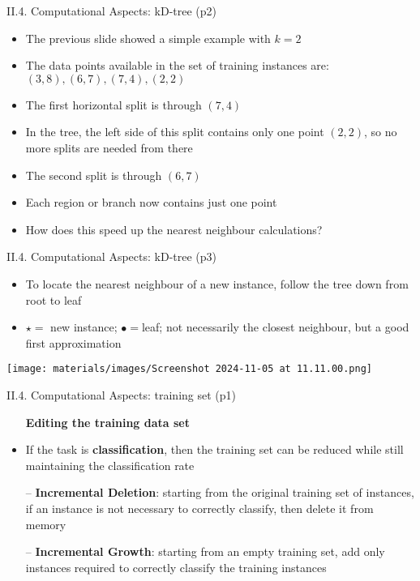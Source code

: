 \documentclass[handout]{beamer}
\newcommand{\strong}[1]{\textbf{\color{teal} #1}}
\begin{document}
\begin{frame}{II.4. Computational Aspects: kD-tree (p2)}
\begin{itemize}
\item The previous slide showed a simple example with $k=2$
\item The data points available in the set of training instances are: $(3,8), (6,7), (7,4), (2,2)$
\item The first horizontal split is through $(7,4)$
\item In the tree, the left side of this split contains only one point $(2,2)$, so no more splits are needed from there
\item The second split is through $(6,7)$
\item Each region or branch now contains just one point
\item[]
\item How does this speed up the nearest neighbour calculations?
\end{itemize}
\end{frame}
\begin{frame}{II.4. Computational Aspects: kD-tree (p3)}
\begin{itemize}
\item To locate the nearest neighbour of a new instance, follow the tree down from root to leaf
\item $\star=$ new instance; $\bullet=$leaf; not necessarily the closest neighbour, but a good first approximation
\end{itemize}
\begin{center}
\texttt{[image: materials/images/Screenshot 2024-11-05 at 11.11.00.png]}\\
\cite[Figure 4.13]{WFH3:2011}
\end{center}
\end{frame}
\begin{frame}{II.4. Computational Aspects: training set (p1)}
\begin{itemize}
\item[] \strong{Editing the training data set}
\item[]
\item If the task is \strong{classification}, then the training set can be reduced while still maintaining the classification rate
\item[--] \strong{Incremental Deletion}: starting from the original training set of instances, if an instance is not necessary to correctly classify, then delete it from memory
\item[--] \strong{Incremental Growth}: starting from an empty training set, add only instances required to correctly classify the training instances
\end{itemize}
\end{frame}
\end{document}
